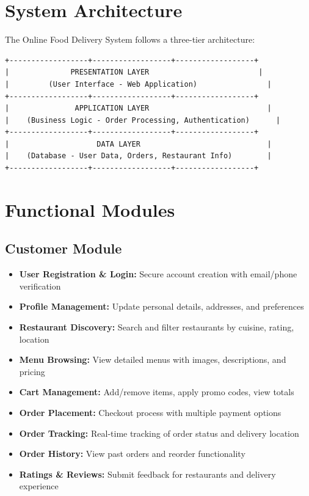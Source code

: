 \documentclass[12pt,a4paper]{report}
\begin{document}
\section{System Architecture}
The Online Food Delivery System follows a three-tier architecture:

\begin{verbatim}
+------------------+------------------+------------------+
|              PRESENTATION LAYER                         |
|         (User Interface - Web Application)                |
+------------------+------------------+------------------+
|               APPLICATION LAYER                           |
|    (Business Logic - Order Processing, Authentication)      |
+------------------+------------------+------------------+
|                    DATA LAYER                             |
|    (Database - User Data, Orders, Restaurant Info)        |
+------------------+------------------+------------------+
\end{verbatim}

\section{Functional Modules}

\subsection{Customer Module}
\begin{itemize}[leftmargin=*]
    \item \textbf{User Registration \& Login:} Secure account creation with email/phone verification
    \item \textbf{Profile Management:} Update personal details, addresses, and preferences
    \item \textbf{Restaurant Discovery:} Search and filter restaurants by cuisine, rating, location
    \item \textbf{Menu Browsing:} View detailed menus with images, descriptions, and pricing
    \item \textbf{Cart Management:} Add/remove items, apply promo codes, view totals
    \item \textbf{Order Placement:} Checkout process with multiple payment options
    \item \textbf{Order Tracking:} Real-time tracking of order status and delivery location
    \item \textbf{Order History:} View past orders and reorder functionality
    \item \textbf{Ratings \& Reviews:} Submit feedback for restaurants and delivery experience
\end{itemize}
\end{document}
